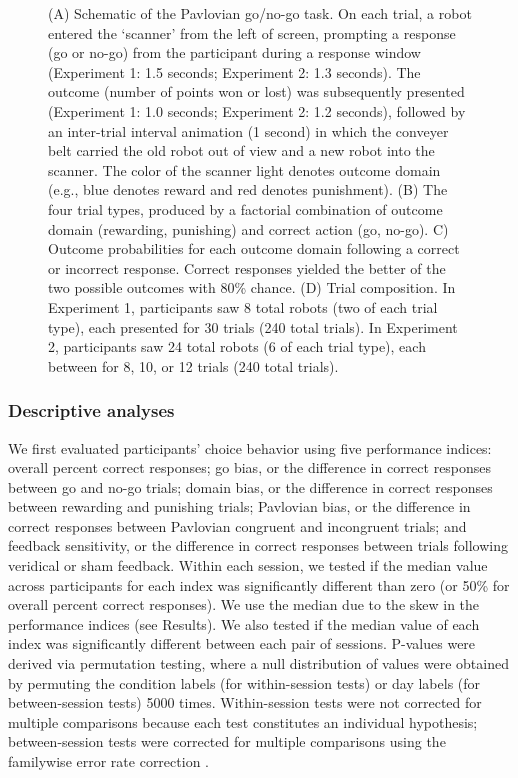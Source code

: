 \documentclass[a4paper,12pt]{article}
\begin{document}
\begin{refsection}[main]
\begin{figure}[t]
    \centerline{}
    \caption{(A) Schematic of the Pavlovian go/no-go task. On each trial, a robot entered the `scanner' from the left of screen, prompting a response (go or no-go) from the participant during a response window (Experiment 1: 1.5 seconds; Experiment 2: 1.3 seconds). The outcome (number of points won or lost) was subsequently presented (Experiment 1: 1.0 seconds; Experiment 2: 1.2 seconds), followed by an inter-trial interval animation (1 second) in which the conveyer belt carried the old robot out of view and a new robot into the scanner. The color of the scanner light denotes outcome domain (e.g., blue denotes reward and red denotes punishment). (B) The four trial types, produced by a factorial combination of outcome domain (rewarding, punishing) and correct action (go, no-go). C) Outcome probabilities for each outcome domain following a correct or incorrect response. Correct responses yielded the better of the two possible outcomes with 80\% chance. (D) Trial composition. In Experiment 1, participants saw 8 total robots (two of each trial type), each presented for 30 trials (240 total trials). In Experiment 2, participants saw 24 total robots (6 of each trial type), each between for 8, 10, or 12 trials (240 total trials).}
    \label{fig:task_schematic}
\end{figure}

\subsubsection*{Descriptive analyses}

We first evaluated participants' choice behavior using five performance indices: overall percent correct responses; go bias, or the difference in correct responses between go and no-go trials; domain bias, or the difference in correct responses between rewarding and punishing trials; Pavlovian bias, or the difference in correct responses between Pavlovian congruent and incongruent trials; and feedback sensitivity, or the difference in correct responses between trials following veridical or sham feedback. Within each session, we tested if the median value across participants for each index was significantly different than zero (or 50\% for overall percent correct responses). We use the median due to the skew in the performance indices (see Results). We also tested if the median value of each index was significantly different between each pair of sessions. P-values were derived via permutation testing, where a null distribution of values were obtained by permuting the condition labels (for within-session tests) or day labels (for between-session tests) 5000 times. Within-session tests were not corrected for multiple comparisons because each test constitutes an individual hypothesis; between-session tests were corrected for multiple comparisons using the familywise error rate correction \cite{winkler2014permutation}.


\end{refsection}
\end{document}
